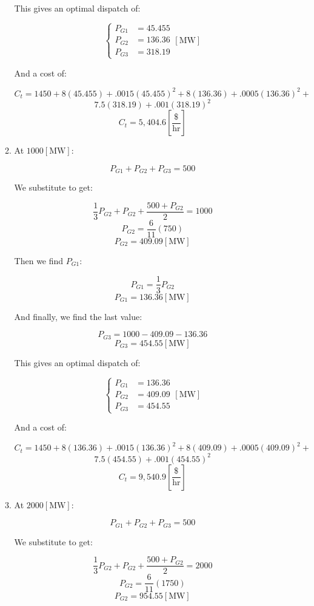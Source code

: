 \begin{enumerate}
\begin{enumerate}
        This gives an optimal dispatch of:

        $$\boxed{\left\{\begin{array}{ll} P_{G1}&= 45.455\\P_{G2}&= 136.36\\P_{G3}&= 318.19\end{array}[\si{\mega\watt}]}$$

        And a cost of:

        $$C_t=1450+8(45.455)+.0015(45.455)^2+8(136.36)+.0005(136.36)^2+$$
        $$7.5(318.19)+.001(318.19)^2$$
        $$\boxed{C_t=5,404.6\left[ \frac{\$}{\text{hr}} \right]}$$

      \item At $1000[\si{\mega\watt}]$:

        $$P_{G1}+P_{G2}+P_{G3}=500$$

        We substitute to get:

        $$\frac{1}{3}P_{G2}+P_{G2}+\frac{500+P_{G2}}{2}=1000$$
        $$P_{G2}=\frac{6}{11}(750)$$
        $$\boxed{P_{G2}=409.09[\si{\mega\watt}]}$$

        Then we find $P_{G1}$:

        $$P_{G1}=\frac{1}{3}P_{G2}$$
        $$\boxed{P_{G1}=136.36[\si{\mega\watt}]}$$

        And finally, we find the last value:

        $$P_{G3}=1000-409.09-136.36$$
        $$\boxed{P_{G3}=454.55[\si{\mega\watt}]}$$

        This gives an optimal dispatch of:

        $$\boxed{\left\{\begin{array}{ll} P_{G1}&= 136.36\\P_{G2}&= 409.09\\P_{G3}&= 454.55\end{array}[\si{\mega\watt}]}$$

        And a cost of:

        $$C_t=1450+8(136.36)+.0015(136.36)^2+8(409.09)+.0005(409.09)^2+$$
        $$7.5(454.55)+.001(454.55)^2$$
        $$\boxed{C_t=9,540.9\left[ \frac{\$}{\text{hr}} \right]}$$

      \item At $2000[\si{\mega\watt}]$:

        $$P_{G1}+P_{G2}+P_{G3}=500$$

        We substitute to get:

        $$\frac{1}{3}P_{G2}+P_{G2}+\frac{500+P_{G2}}{2}=2000$$
        $$P_{G2}=\frac{6}{11}(1750)$$
        $$\boxed{P_{G2}=954.55[\si{\mega\watt}]}$$


\end{enumerate}
\end{enumerate}
